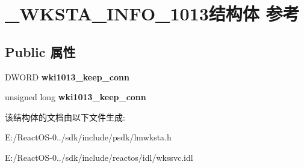 \hypertarget{struct___w_k_s_t_a___i_n_f_o__1013}{}\section{\+\_\+\+W\+K\+S\+T\+A\+\_\+\+I\+N\+F\+O\+\_\+1013结构体 参考}
\label{struct___w_k_s_t_a___i_n_f_o__1013}
\subsection*{Public 属性}
\begin{DoxyCompactItemize}
\item 
\mbox{\label{struct___w_k_s_t_a___i_n_f_o__1013_a842237055bc93bbb2ebb531e86017e03}} 
D\+W\+O\+RD {\bfseries wki1013\+\_\+keep\+\_\+conn}
\item 
\mbox{\label{struct___w_k_s_t_a___i_n_f_o__1013_ab77f4dab646b80667a470bfc5af1ff7d}} 
unsigned long {\bfseries wki1013\+\_\+keep\+\_\+conn}
\end{DoxyCompactItemize}


该结构体的文档由以下文件生成\+:\begin{DoxyCompactItemize}
\item 
E\+:/\+React\+O\+S-\/0../sdk/include/psdk/lmwksta.\+h\item 
E\+:/\+React\+O\+S-\/0../sdk/include/reactos/idl/wkssvc.\+idl\end{DoxyCompactItemize}
